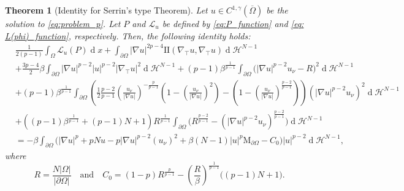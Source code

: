 \documentclass[10pt,a4paper, reqno]{amsart}
\numberwithin{equation}{section}
\newtheorem{teo}{Theorem}[section]
\renewcommand{\d}[1]{\ensuremath{\operatorname{d}\!{#1}}}
\begin{document}
\begin{teo}[Identity for Serrin's type Theorem] \label{teo: identity serrin}
Let $u \in C^{1,\gamma}(\overline{\Omega})$ be the solution to \eqref{eq:problem_p}. Let $P$ and $\mathcal{L}_u$ be defined by \eqref{eq:P_function} and \eqref{eq: L(phi)_function}, respectively. Then, the following identity holds:
\begin{equation}\label{eq: fundamental identity for serrin}
    \begin{aligned}
    &\frac{1}{2(p-1)}\int_\Omega \mathcal{L}_u(P) \d{x} +\int_{\partial\Omega} |\nabla u|^{2p-4} \mathrm{I\!I}(\nabla_\top u,\nabla_\top u) \d{}\mathcal{H}^{N-1} 
    \\
    &+ \frac{3p-4}{2} \beta \int_{\partial\Omega} |\nabla u|^{p-2}|u|^{p-2}|\nabla_\top u|^2 \d{}\mathcal{H}^{N-1} 
    + (p-1) \beta^{\frac{1}{p-1}} \int_{\partial\Omega} \Big(|\nabla u|^{p-2} u_\nu - R \Big)^2  \d{}\mathcal{H}^{N-1}  
    \\
    &
    + (p-1) \beta^{\frac{1}{p-1}}  \int_{\partial\Omega}  \left( \frac{1}{2} \frac{p-2}{p-1} \left(\frac{u_\nu}{|\nabla u|}\right)^{-\frac{p}{p-1}} \left(1- \left(\frac{u_\nu}{|\nabla u|}\right)^2 \right) - \left(1- \left(\frac{u_\nu}{|\nabla u|}\right)^{\frac{p-2}{p-1}} \right) \right) (|\nabla u|^{p-2} u_\nu)^2 \d{}\mathcal{H}^{N-1} 
    \\
    &
    + \left( (p-1) \beta^{\frac{1}{p-1}} + (p-1)N + 1 \right) R^{\frac{1}{p-1}}  \int_{\partial\Omega} \Big( R^{\frac{p-2}{p-1}} - (|\nabla u|^{p-2} u_\nu)^{\frac{p-2}{p-1}} \Big)  \d{}\mathcal{H}^{N-1}
    \\
    &
    = - \beta \int_{\partial\Omega} \Big( |\nabla u|^p + pNu - p |\nabla u|^{p-2} (u_\nu)^2 + \beta(N-1) |u|^p \mathrm{M}_{\partial\Omega}  - C_0 \Big) |u|^{p-2} \d{}\mathcal{H}^{N-1},  
    \end{aligned}
\end{equation}
where
\begin{equation*}
    R = \frac{N|\Omega|}{|\partial\Omega|} \quad \text{and} \quad  C_0 = (1-p)R^{\frac{p}{p-1}} - \left( \frac{R}{\beta} \right)^{\frac{1}{p-1}} \big( (p-1)N + 1 \big). 
\end{equation*}
\end{teo}
\end{document}
